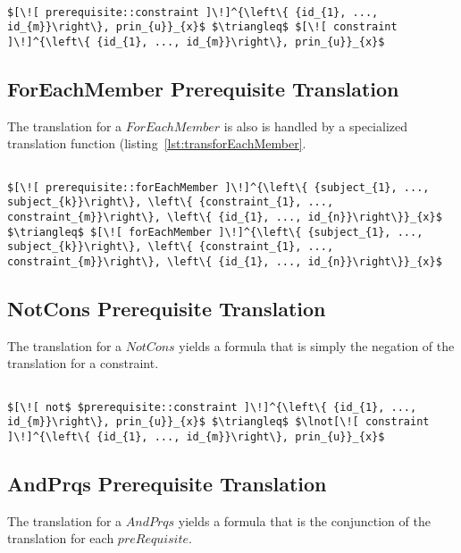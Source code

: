 \lstset{mathescape, language=AST}  
\begin{lstlisting}[frame=single, caption={Prerequisite Translation {$\colon$} Constraint},label={lst:transpreRequisiteConstraint}]

$[\![ prerequisite::constraint ]\!]^{\left\{ {id_{1}, ..., id_{m}}\right\}, prin_{u}}_{x}$ $\triangleq$ $[\![ constraint ]\!]^{\left\{ {id_{1}, ..., id_{m}}\right\}, prin_{u}}_{x}$ 
\end{lstlisting}

\subsection{ForEachMember Prerequisite Translation}
The translation for a $ForEachMember$ is also is handled by a specialized translation function (listing~\ref{lst:transforEachMember}.

\lstset{mathescape, language=AST}  
\begin{lstlisting}[frame=single, caption={Prerequisite Translation {$\colon$} ForEachMember},label={lst:transpreRequisiteForEachMember}]

$[\![ prerequisite::forEachMember ]\!]^{\left\{ {subject_{1}, ..., subject_{k}}\right\}, \left\{ {constraint_{1}, ..., constraint_{m}}\right\}, \left\{ {id_{1}, ..., id_{n}}\right\}}_{x}$ $\triangleq$ $[\![ forEachMember ]\!]^{\left\{ {subject_{1}, ..., subject_{k}}\right\}, \left\{ {constraint_{1}, ..., constraint_{m}}\right\}, \left\{ {id_{1}, ..., id_{n}}\right\}}_{x}$ 	
\end{lstlisting}

\subsection{NotCons Prerequisite Translation}
The translation for a $NotCons$ yields a formula that is simply the negation of the translation for a constraint.

\lstset{mathescape, language=AST}  
\begin{lstlisting}[frame=single, caption={Prerequisite Translation {$\colon$} Not Constraint},label={lst:transpreRequisiteNotConstraint}]

$[\![ not$ $prerequisite::constraint ]\!]^{\left\{ {id_{1}, ..., id_{m}}\right\}, prin_{u}}_{x}$ $\triangleq$ $\lnot[\![ constraint ]\!]^{\left\{ {id_{1}, ..., id_{m}}\right\}, prin_{u}}_{x}$ 
\end{lstlisting}

\subsection{AndPrqs Prerequisite Translation}
The translation for a $AndPrqs$ yields a formula that is the conjunction of the translation for each $preRequisite$.

